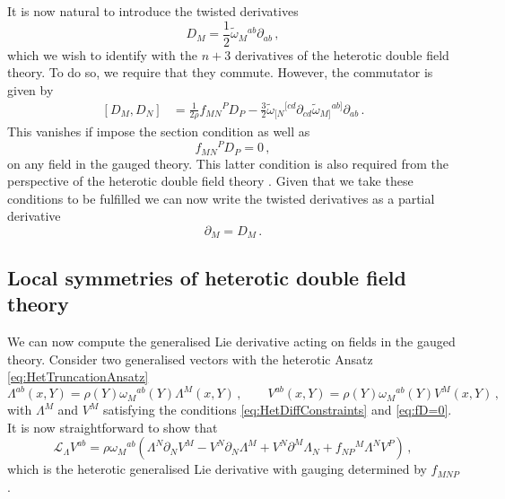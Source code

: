 \documentclass{PoS}
\newcommand{\tomega}{\tilde{\omega}}
\newcommand{\gL}{\mathcal{L}}
\begin{document}
It is now natural to introduce the twisted derivatives
\begin{equation}
 D_M = \frac12 \tomega_M{}^{ab} \partial_{ab} \,,
\end{equation}
which we wish to identify with the $n+3$ derivatives of the heterotic double field theory. To do so, we require that they commute. However, the commutator is given by
\begin{equation}
 \begin{split}
  \left[ D_M, D_N \right] &= \frac{1}{2\rho} f_{MN}{}^P D_P - \frac32 \tomega_{[N}{}^{[cd} \partial_{cd} \tomega_{M]}{}^{ab]} \partial_{ab} \,.
 \end{split}
\end{equation}
This vanishes if impose the section condition as well as 
\begin{equation}
 f_{MN}{}^P D_P = 0 \,, \label{eq:fD=0}
\end{equation}
on any field in the gauged theory. This latter condition is also required from the perspective of the heterotic double field theory \cite{Hohm:2011ex}. Given that we take these conditions to be fulfilled we can now write the twisted derivatives as a partial derivative
\begin{equation}
 \partial_M = D_M \,.
\end{equation}

\subsection{Local symmetries of heterotic double field theory}
We can now compute the generalised Lie derivative acting on fields in the gauged theory. Consider two generalised vectors with the heterotic Ansatz \eqref{eq:HetTruncationAnsatz}
\begin{equation}
 \Lambda^{ab}(x,Y) = \rho(Y) \omega_M{}^{ab}(Y) \Lambda^M(x,Y) \,, \qquad V^{ab}(x,Y) = \rho(Y) \omega_M{}^{ab}(Y) V^M(x,Y) \,,
\end{equation}
with $\Lambda^M$ and $V^M$ satisfying the conditions \eqref{eq:HetDiffConstraints} and \eqref{eq:fD=0}. It is now straightforward to show that
\begin{equation}
 \gL_{\Lambda} V^{ab} = \rho \omega_M{}^{ab} \left( \Lambda^N \partial_N V^M - V^N \partial_N \Lambda^M + V^N \partial^M \Lambda_N + f_{NP}{}^M \Lambda^N V^P \right) \,, \label{eq:HetGL}
\end{equation}
which is the heterotic generalised Lie derivative with gauging determined by $f_{MNP}$.
\end{document}
